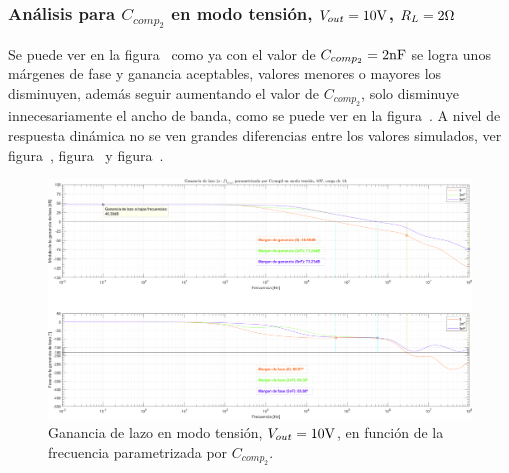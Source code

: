 
\subsubsection{Análisis para $C_{comp_{2}}$ en modo tensión, $V_{out} = 10 \si[per-mode=symbol]{\volt}$, $R_{L} = 2 \si[per-mode=symbol]{\ohm}$}

Se puede ver en la figura~ como ya con el valor de $C_{comp_{2}} = 2 \si[per-mode=symbol]{\nano\farad}$ se logra unos márgenes de fase y ganancia aceptables, valores menores o mayores los disminuyen, además seguir aumentando el valor de $C_{comp_{2}}$, solo disminuye innecesariamente el ancho de banda, como se puede ver en la figura~. A nivel de respuesta dinámica no se ven grandes diferencias entre los valores simulados, ver figura~, figura~ y figura~.

\vfill



\clearpage

\begin{figure}[H] %
\begin{center}
\includegraphics[width=1.1 \textwidth, angle=90]{./img/plots/loop/power_supply_CCOMP2_LOOP_Modo1.png}
\caption{\label{fig:fig_power_supply_CCOMP2_LOOP_Modo1}\footnotesize{Ganancia de lazo en modo tensión, $V_{out} = 10 \si[per-mode=symbol]{\volt}$, en función de la frecuencia parametrizada por $C_{comp_{2}}$.}}
\end{center}
\end{figure}


\clearpage

